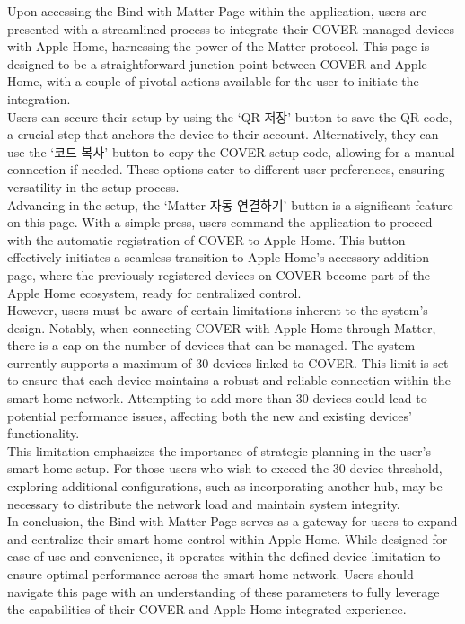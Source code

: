 \documentclass[conference]{IEEEtran}
\begin{document}
\begin{enumerate}[label=\arabic*.]
Upon accessing the Bind with Matter Page within the application, users are presented with a streamlined process to integrate their COVER-managed devices with Apple Home, harnessing the power of the Matter protocol. This page is designed to be a straightforward junction point between COVER and Apple Home, with a couple of pivotal actions available for the user to initiate the integration.\\
Users can secure their setup by using the ‘QR 저장’ button to save the QR code, a crucial step that anchors the device to their account. Alternatively, they can use the ‘코드 복사’ button to copy the COVER setup code, allowing for a manual connection if needed. These options cater to different user preferences, ensuring versatility in the setup process.\\
Advancing in the setup, the ‘Matter 자동 연결하기’ button is a significant feature on this page. With a simple press, users command the application to proceed with the automatic registration of COVER to Apple Home. This button effectively initiates a seamless transition to Apple Home’s accessory addition page, where the previously registered devices on COVER become part of the Apple Home ecosystem, ready for centralized control.\\
However, users must be aware of certain limitations inherent to the system's design. Notably, when connecting COVER with Apple Home through Matter, there is a cap on the number of devices that can be managed. The system currently supports a maximum of 30 devices linked to COVER. This limit is set to ensure that each device maintains a robust and reliable connection within the smart home network. Attempting to add more than 30 devices could lead to potential performance issues, affecting both the new and existing devices' functionality.\\
This limitation emphasizes the importance of strategic planning in the user's smart home setup. For those users who wish to exceed the 30-device threshold, exploring additional configurations, such as incorporating another hub, may be necessary to distribute the network load and maintain system integrity.\\
In conclusion, the Bind with Matter Page serves as a gateway for users to expand and centralize their smart home control within Apple Home. While designed for ease of use and convenience, it operates within the defined device limitation to ensure optimal performance across the smart home network. Users should navigate this page with an understanding of these parameters to fully leverage the capabilities of their COVER and Apple Home integrated experience.\\

\end{enumerate}
\end{document}
